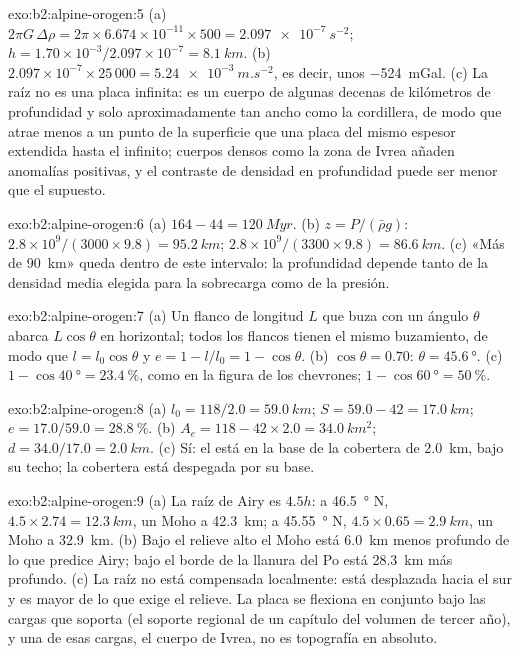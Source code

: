\begin{solution}{exo:b2:alpine-orogen:5}
(a) $2\pi G\,\Delta\rho = 2\pi\times6.674\times10^{-11}\times500 =
\qty{2.097e-7}{s^{-2}}$; $h = 1.70\times10^{-3}/2.097\times10^{-7} = \qty{8.1}{km}$.
(b) $2.097\times10^{-7}\times25\,000 = \qty{5.24e-3}{m.s^{-2}}$, es decir, unos
\qty{-524}{mGal}. (c) La raíz no es una placa infinita: es un cuerpo de algunas decenas de kilómetros
de profundidad y solo aproximadamente tan ancho como la cordillera, de modo que atrae menos a un punto de la superficie que una
placa del mismo espesor extendida hasta el infinito; cuerpos densos como la zona de Ivrea
añaden anomalías positivas, y el contraste de densidad en profundidad puede ser menor que el supuesto.
\end{solution}

\begin{solution}{exo:b2:alpine-orogen:6}
(a) $164 - 44 = \qty{120}{Myr}$. (b) $z = P/(\bar\rho g)$:
$2.8\times10^9/(3000\times9.8) = \qty{95.2}{km}$; $2.8\times10^9/(3300\times9.8) =
\qty{86.6}{km}$. (c) «Más de \qty{90}{km}» queda dentro de este intervalo: la profundidad depende tanto
de la densidad media elegida para la sobrecarga como de la presión.
\end{solution}

\begin{solution}{exo:b2:alpine-orogen:7}
(a) Un flanco de longitud $L$ que buza con un ángulo $\theta$ abarca $L\cos\theta$ en horizontal; todos los flancos
tienen el mismo buzamiento, de modo que $l = l_0\cos\theta$ y $e = 1 - l/l_0 = 1 - \cos\theta$.
(b) $\cos\theta = 0.70$: $\theta = \qty{45.6}{\degree}$. (c) $1 - \cos\qty{40}{\degree} =
\qty{23.4}{\percent}$, como en la figura de los chevrones; $1 - \cos\qty{60}{\degree}
= \qty{50}{\percent}$.
\end{solution}

\begin{solution}{exo:b2:alpine-orogen:8}
(a) $l_0 = 118/2.0 = \qty{59.0}{km}$; $S = 59.0 - 42 = \qty{17.0}{km}$; $e = 17.0/59.0 =
\qty{28.8}{\percent}$. (b) $A_e = 118 - 42\times2.0 = \qty{34.0}{km^2}$; $d = 34.0/17.0 =
\qty{2.0}{km}$. (c) Sí: el  está en la base de la cobertera de \qty{2.0}{km}, bajo
su techo; la cobertera está despegada por su base.
\end{solution}

\begin{solution}{exo:b2:alpine-orogen:9}
(a) La raíz de Airy es $4.5h$: a \qty{46.5}{\degree} N, $4.5\times2.74 = \qty{12.3}{km}$, un
Moho a \qty{42.3}{km}; a \qty{45.55}{\degree} N, $4.5\times0.65 = \qty{2.9}{km}$, un Moho
a \qty{32.9}{km}. (b) Bajo el relieve alto el Moho está \qty{6.0}{km} menos profundo de lo que predice
Airy; bajo el borde de la llanura del Po está \qty{28.3}{km} más profundo. (c) La raíz no está
compensada localmente: está desplazada hacia el sur y es mayor de lo que exige el relieve.
La placa se flexiona en conjunto bajo las cargas que soporta (el soporte regional de un capítulo del volumen de tercer
año), y una de esas cargas, el cuerpo de Ivrea, no es topografía en absoluto.
\end{solution}

